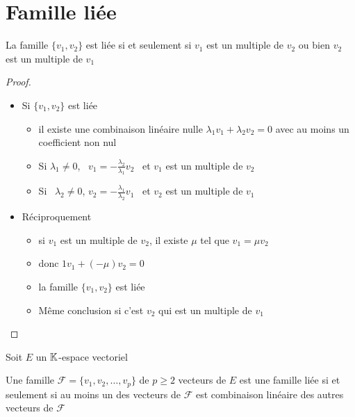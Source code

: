\section{Famille liée}

\begin{frame}
\begin{proposition}
La famille $\{ v_1, v_2\}$ est liée si
et seulement si $v_1$ est un multiple de $v_2$ ou bien
$v_2$ est un multiple de $v_1$
\end{proposition}
\pause
\begin{proof}
\begin{itemize}
  \item Si $\{ v_1, v_2\}$ est liée\begin{itemize}
  \item
    il existe une combinaison lin\'eaire nulle 
$\lambda_1 v_1+\lambda_2 v_2= 0$ avec au moins un coefficient non nul 
\pause
\item
Si $\lambda_1\neq0$,
\ $ v_1=-\frac{\lambda_2}{\lambda_1} v_2$ \ et $ v_1$ est un multiple de $v_2$
\item
\pause
Si \ $\lambda_2\neq 0$, $ v_2=-\frac{\lambda_1}{\lambda_2} v_1$ \ et $v_2$ est un multiple de $ v_1$  
\end{itemize}
  \pause
  \item Réciproquement 
  \begin{itemize}
  \item si $ v_1$ est un multiple de $ v_2$, il
existe   $\mu$ tel que $ v_1=\mu  v_2$
\pause
 \item donc $1 v_1+(-\mu) v_2= 0$
\pause 
\item la famille $\{ v_1, v_2\}$ est liée
\pause
\item
Même conclusion si c'est $v_2$ qui est un multiple de $ v_1$
\end{itemize}
\end{itemize}
\end{proof}
\end{frame}


\begin{frame}
Soit $E$ un $\mathbb{K}$-espace vectoriel 
\begin{theoreme}
\label{carac liee}
Une famille $\mathcal{F}=\{v_1, v_2,\ldots, v_p\}$ de $p\ge 2$ 
vecteurs de $E$ est une famille liée si et seulement si 
au moins un des vecteurs de $\mathcal{F}$ est combinaison linéaire 
des autres vecteurs de $\mathcal{F}$
\end{theoreme}
\end{frame}


